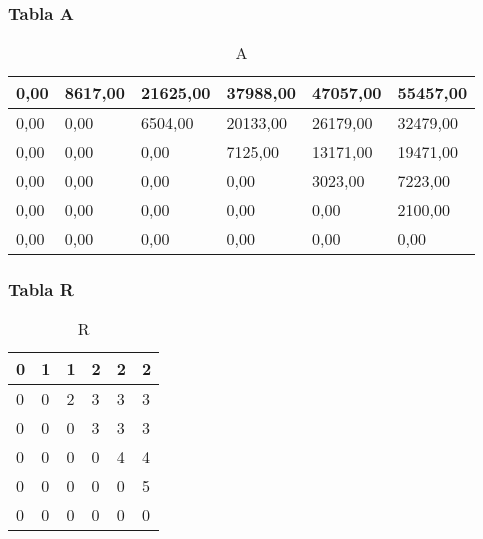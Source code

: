 \documentclass[10]{beamer}
\begin{document}
\begin{frame}\frametitle{Tabla A}
 \color{white}
\begin{table}[H]
\centering
\caption{A}
\label{A}
\begin{tabular}{|l|l|l|l|l|l|}
\hline
0,00& 8617,00& 21625,00& 37988,00& 47057,00& 55457,00\\ \hline
0,00& 0,00& 6504,00& 20133,00& 26179,00& 32479,00\\ \hline
0,00& 0,00& 0,00& 7125,00& 13171,00& 19471,00\\ \hline
0,00& 0,00& 0,00& 0,00& 3023,00& 7223,00\\ \hline
0,00& 0,00& 0,00& 0,00& 0,00& 2100,00\\ \hline
0,00& 0,00& 0,00& 0,00& 0,00& 0,00\\ \hline
\end{tabular}
\end{table} 
\end{frame} 
\begin{frame}\frametitle{Tabla R}
 \color{white}
\begin{table}[H]
\centering
\caption{R}
\label{R}
\begin{tabular}{|l|l|l|l|l|l|}
\hline
0& 1& 1& 2& 2& 2\\ \hline
0& 0& 2& 3& 3& 3\\ \hline
0& 0& 0& 3& 3& 3\\ \hline
0& 0& 0& 0& 4& 4\\ \hline
0& 0& 0& 0& 0& 5\\ \hline
0& 0& 0& 0& 0& 0\\ \hline
\end{tabular}
\end{table} 
\end{frame} 
\end{document}
